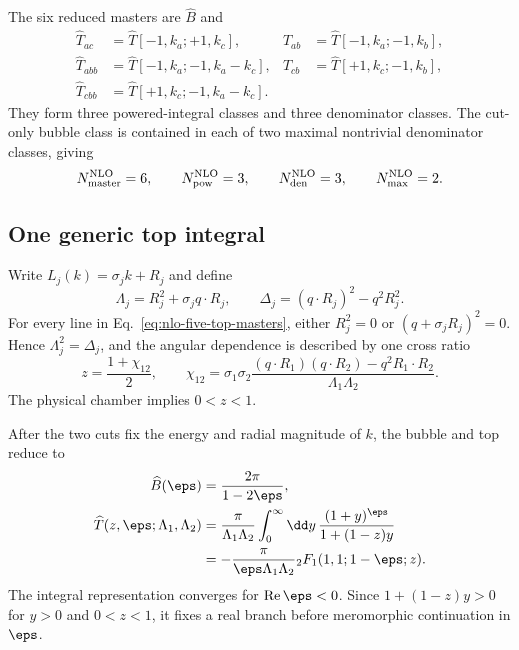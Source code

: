 The six reduced masters are $\widehat B$ and
\begin{equation}
\begin{aligned}
 \widehat T_{ac}&=\widehat T[-1,k_a;+1,k_c],
 &\widehat T_{ab}&=\widehat T[-1,k_a;-1,k_b],\\
 \widehat T_{abb}&=\widehat T[-1,k_a;-1,k_a-k_c],
 &\widehat T_{cb}&=\widehat T[+1,k_c;-1,k_b],\\
 \widehat T_{cbb}&=\widehat T[+1,k_c;-1,k_a-k_c].
\end{aligned}
\label{eq:nlo-five-top-masters}
\end{equation}
They form three powered-integral classes and three denominator classes.  The
cut-only bubble class is contained in each of two maximal nontrivial
denominator classes, giving
\begin{equation}
 N_{\rm master}^{\rm NLO}=6,
 \qquad N_{\rm pow}^{\rm NLO}=3,
 \qquad N_{\rm den}^{\rm NLO}=3,
 \qquad N_{\rm max}^{\rm NLO}=2.
 \label{eq:nlo-class-counts}
\end{equation}

\subsection{One generic top integral}

Write $L_j(k)=\sigma_jk+R_j$ and define
\begin{equation}
 \Lambda_j=R_j^2+\sigma_jq\cdot R_j,
 \qquad
 \Delta_j=(q\cdot R_j)^2-q^2R_j^2.
 \label{eq:nlo-lambda-delta}
\end{equation}
For every line in Eq.~\eqref{eq:nlo-five-top-masters}, either $R_j^2=0$ or
$(q+\sigma_jR_j)^2=0$.  Hence $\Lambda_j^2=\Delta_j$, and the angular
dependence is described by one cross ratio
\begin{equation}
 z=\frac{1+\chi_{12}}{2},
 \qquad
 \chi_{12}=\sigma_1\sigma_2
 \frac{(q\cdot R_1)(q\cdot R_2)-q^2R_1\cdot R_2}
      {\Lambda_1\Lambda_2}.
 \label{eq:nlo-cross-ratio}
\end{equation}
The physical chamber implies $0<z<1$.

After the two cuts fix the energy and radial magnitude of $k$, the bubble
and top reduce to
\begin{align}
 \widehat B(\eps)&=\frac{2\pi}{1-2\eps},
 \label{eq:nlo-bubble-result}\\
 \widehat T(z,\eps;\Lambda_1,\Lambda_2)
 &=\frac{\pi}{\Lambda_1\Lambda_2}
 \int_0^\infty\dd y\,
 \frac{(1+y)^\eps}{1+(1-z)y}
 \notag\\
 &=-\frac{\pi}{\eps\Lambda_1\Lambda_2}
 {}_2F_1(1,1;1-\eps;z).
 \label{eq:nlo-generic-top}
\end{align}
The integral representation converges for $\operatorname{Re}\eps<0$.  Since
$1+(1-z)y>0$ for $y>0$ and $0<z<1$, it fixes a real branch before
meromorphic continuation in $\eps$.

